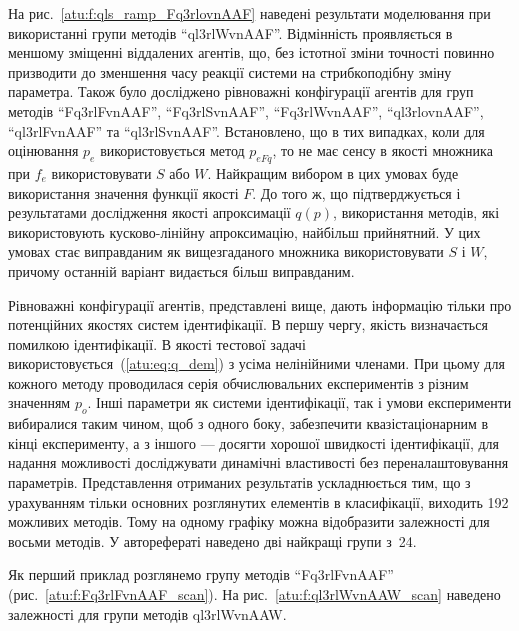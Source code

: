 \documentclass[a4paper,13pt]{atuaref}
\begin{document}
На рис.~\ref{atu:f:qls_ramp_Fq3rlovnAAF} наведені результати моделювання при використанні групи методів
``ql3rlWvnAAF''.
Відмінність проявляється в меншому зміщенні віддалених агентів, що, без
істотної зміни точності повинно призводити до зменшення часу реакції системи на
стрибкоподібну зміну параметра.
Також було досліджено рівноважні конфігурації агентів для
груп методів
``Fq3rlFvnAAF'',
``Fq3rlSvnAAF'',
``Fq3rlWvnAAF'',
``ql3rlovnAAF'',
``ql3rlFvnAAF'' та
``ql3rlSvnAAF''.
Встановлено, що в тих випадках, коли для оцінювання $ p_e $ використовується
метод $ p_{eFq} $, то не має сенсу в якості множника при $ f_e $
використовувати $ S $ або $ W $. Найкращим вибором в цих умовах буде
використання значення функції якості $ F $. До того ж, що підтверджується і
результатами дослідження якості апроксимації $ q (p) $, використання методів,
які використовують кусково-лінійну апроксимацію, найбільш прийнятний. У цих
умовах стає виправданим як вищезгаданого множника використовувати
$ S $ і $ W$, причому останній варіант видається більш виправданим.


Рівноважні конфігурації агентів, представлені вище, дають інформацію тільки про
потенційних якостях систем ідентифікації. В першу чергу, якість визначається
помилкою ідентифікації. В якості тестової задачі
використовується~(\ref{atu:eq:q_dem}) з усіма нелінійними членами. При цьому для кожного методу
проводилася серія обчислювальних експериментів з різним значенням $ p_o $. Інші
параметри як системи ідентифікації, так і умови експерименти вибиралися таким
чином, щоб з одного боку, забезпечити квазістаціонарним в кінці експерименту, а
з іншого --- досягти хорошої швидкості ідентифікації, для надання можливості
досліджувати динамічні властивості без переналаштовування параметрів.
Представлення отриманих результатів ускладнюється тим, що з урахуванням тільки
основних розглянутих елементів в класифікації, виходить 192 можливих методів.
Тому на одному графіку можна відобразити залежності для восьми методів.
У авторефераті наведено дві найкращі групи з~24.

Як перший приклад розглянемо групу методів
``Fq3rlFvnAAF'' (рис.~\ref{atu:f:Fq3rlFvnAAF_scan}).
На рис.~\ref{atu:f:ql3rlWvnAAW_scan} наведено залежності для групи методів ql3rlWvnAAW.
\end{document}
